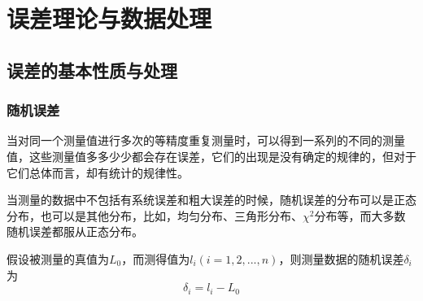 \section{误差理论与数据处理}
\subsection{误差的基本性质与处理}
\subsubsection{随机误差}
当对同一个测量值进行多次的等精度重复测量时，可以得到一系列的不同的测量值，这些测量值多多少少都会存在误差，它们的出现是没有确定的规律的，但对于它们总体而言，却有统计的规律性。

当测量的数据中不包括有系统误差和粗大误差的时候，随机误差的分布可以是正态分布，也可以是其他分布，比如，均匀分布、三角形分布、$ \chi^2 $分布等，而大多数随机误差都服从正态分布。

假设被测量的真值为$ L_0 $，而测得值为$ l_i(i=1,2,...,n) $，则测量数据的随机误差$ \delta_i $为
\begin{equation}
	\delta_i=l_i-L_0
\end{equation}

